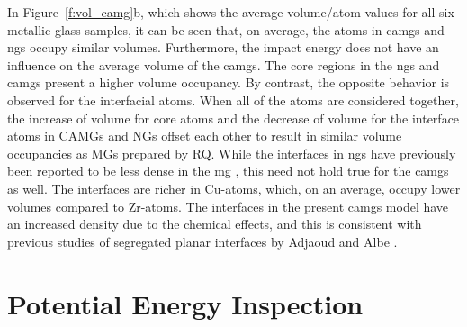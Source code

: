\begin{changebar}
In Figure~\ref{f:vol_camg}b, which shows the average volume/atom values for all six metallic glass samples, it can be seen that, on average, the atoms in \gls{camg}s and \gls{ng}s occupy similar volumes. Furthermore, the impact energy does not have an influence on the average volume of the \gls{camg}s. The core regions in the \gls{ng}s and \gls{camg}s present a higher volume occupancy. By contrast, the opposite behavior is observed for the interfacial atoms. When all of the atoms are considered together, the increase of volume for core atoms and the decrease of volume for the interface atoms in CAMGs and NGs offset each other to result in similar volume occupancies as MGs prepared by RQ. While the interfaces in \gls{ng}s have previously been reported to be less dense in the \gls{mg} \cite{Sopu2009,Witte2013}, this need not hold true for the \gls{camg}s as well. The interfaces are richer in Cu-atoms, which, on an average, occupy lower volumes compared to Zr-atoms. The interfaces in the present \gls{camg}s model have an increased density due to the chemical effects, and this is consistent with previous studies of segregated planar interfaces by Adjaoud and Albe \cite{Adjaoud2016}.
\end{changebar}

%
\section{Potential Energy Inspection} \label{s:camg-pe}

